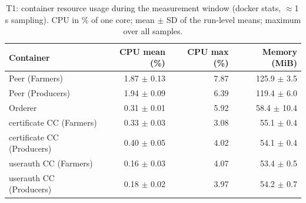 \begin{table}[t]
\centering\small
\caption{T1: container resource usage during the measurement window (docker stats, $\approx$1\,s sampling). CPU in \% of one core; mean $\pm$ SD of the run-level means; maximum over all samples.}
\label{tab:t1-resources}
\begin{tabular}{lrrr}
\toprule
Container & CPU mean (\%) & CPU max (\%) & Memory (MiB) \\
\midrule
Peer (Farmers) & 1.87 $\pm$ 0.13 & 7.87 & 125.9 $\pm$ 3.5 \\
Peer (Producers) & 1.94 $\pm$ 0.09 & 6.39 & 119.4 $\pm$ 6.0 \\
Orderer & 0.31 $\pm$ 0.01 & 5.92 & 58.4 $\pm$ 10.4 \\
certificate CC (Farmers) & 0.33 $\pm$ 0.03 & 3.08 & 55.1 $\pm$ 0.4 \\
certificate CC (Producers) & 0.40 $\pm$ 0.05 & 4.02 & 54.1 $\pm$ 0.4 \\
userauth CC (Farmers) & 0.16 $\pm$ 0.03 & 4.07 & 53.4 $\pm$ 0.5 \\
userauth CC (Producers) & 0.18 $\pm$ 0.02 & 3.97 & 54.2 $\pm$ 0.7 \\
\bottomrule
\end{tabular}
\end{table}
